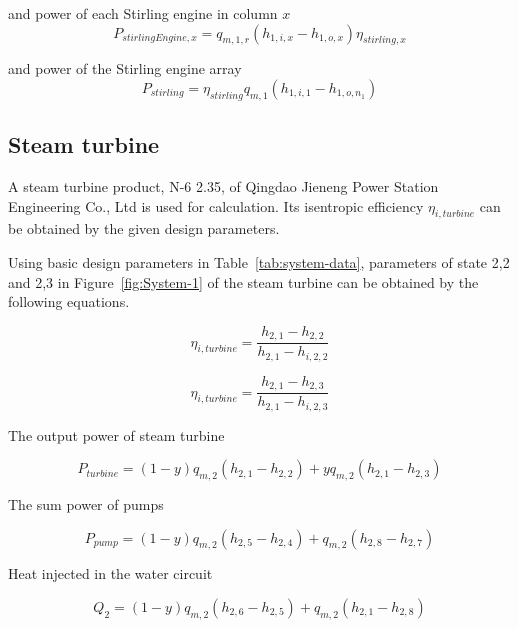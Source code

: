 \documentclass{article}
\begin{document}
and power of each Stirling engine in column $x$
\begin{equation*}
	P_{stirlingEngine,x}=q_{m,1,r}(h_{1,i,x}-h_{1,o,x})\eta_{stirling,x}
\end{equation*}


and power of the Stirling engine array
\begin{equation*}
	P_{stirling}=\eta_{stirling}q_{m,1}(h_{1,i,1}-h_{1,o,n_1})
\end{equation*}

\subsection{Steam turbine}

A steam turbine product, N-6 2.35, of Qingdao Jieneng Power Station Engineering Co., Ltd is used for calculation. Its isentropic efficiency $\eta_{i,turbine}$ can be obtained by the given design parameters.

Using basic design parameters in Table~\ref{tab:system-data}, parameters of state 2,2 and 2,3 in Figure~\ref{fig:System-1} of the steam turbine can be obtained by the following equations.

\begin{equation*}
	\eta_{i,turbine}=\frac{h_{2,1}-h_{2,2}}{h_{2,1}-h_{i,2,2}}
\end{equation*}

\begin{equation*}
	\eta_{i,turbine}=\frac{h_{2,1}-h_{2,3}}{h_{2,1}-h_{i,2,3}}
\end{equation*}

The output power of steam turbine

\begin{equation*}
	P_{turbine}=\left(1-y\right)q_{m,2}\left(h_{2,1}-h_{2,2}\right)+yq_{m,2}\left(h_{2,1}-h_{2,3}\right)
\end{equation*}

The sum power of pumps

\begin{equation*}
	P_{pump}=\left(1-y\right)q_{m,2}\left(h_{2,5}-h_{2,4}\right)+q_{m,2}\left(h_{2,8}-h_{2,7}\right)
\end{equation*}

Heat injected in the water circuit

\begin{equation*}
	Q_2=\left(1-y\right)q_{m,2}\left(h_{2,6}-h_{2,5}\right)+q_{m,2}\left(h_{2,1}-h_{2,8}\right)
\end{equation*}
\end{document}
